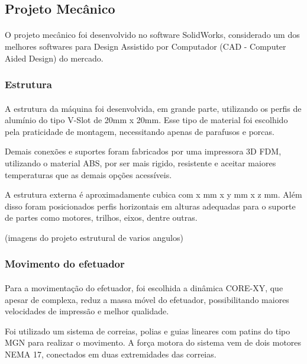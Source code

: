 \documentclass[12pt, english]{article}
\begin{document}
\subsection{Projeto Mecânico}

\paragraph{}
O projeto mecânico foi desenvolvido no software SolidWorks, considerado um dos melhores softwares para Design Assistido por Computador (CAD - Computer Aided Design) do mercado.

\subsubsection{Estrutura}

\setlength{\parindent}{20pt}

\paragraph{}
A estrutura da máquina foi desenvolvida, em grande parte, utilizando os perfis de alumínio do tipo V-Slot de 20mm x 20mm. Esse tipo de material foi escolhido pela praticidade de montagem, necessitando apenas de parafusos e porcas.

Demais conexões e suportes foram fabricados por uma impressora 3D FDM, utilizando o material ABS, por ser mais rigido, resistente e aceitar maiores temperaturas que as demais opções acessíveis.

A estrutura externa é aproximadamente cubica com x mm x y mm x z mm. Além disso foram posicionados perfis horizontais em alturas adequadas para o suporte de partes como motores, trilhos, eixos, dentre outras.

(imagens do projeto estrutural de varios angulos)

\subsubsection{Movimento do efetuador}

\paragraph{}
Para a movimentação do efetuador, foi escolhida a dinâmica CORE-XY, que apesar de complexa, reduz a massa móvel do efetuador, possibilitando maiores velocidades de impressão e melhor qualidade.

Foi utilizado um sistema de correias, polias e guias lineares com patins do tipo MGN para realizar o movimento. A força motora do sistema vem de dois motores NEMA 17, conectados em duas extremidades das correias. 
\end{document}
